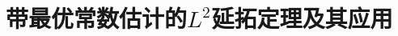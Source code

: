 \documentclass[lang=cn,zihao=-4,a4paper,fontset=none]{beautybook}
\begin{document}
\part{带最优常数估计的\texorpdfstring{$L^2$}{}延拓定理及其应用}
% 



\appendix




\end{document}
